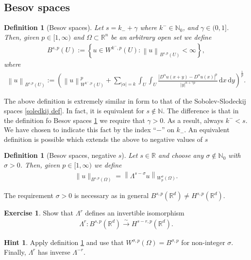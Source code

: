 \documentclass[
    a4paper,
    DIV=14,
    abstract=true,
    numbers=noenddot
]
{scrartcl}
\newtheorem{definition}[theorem]{Definition}
\theoremstyle{definition}
\newtheorem{exercise}{Exercise}
\newtheorem*{hint}{Hint}
\newcommand{\set}[1]{\left\{#1\right\}}
\renewcommand{\norm}[1]{\left\lVert #1 \right\rVert}\renewcommand{\abs}[1]{\left| #1 \right|}
\newcommand{\iso}{\xrightarrow{\sim}}
\renewcommand{\d}{\,\mathrm{d}}\newcommand{\dx}{\,\mathrm{d}x}
\newcommand{\N}{\mathbb{N}}
\newcommand{\R}{\mathbb{R}}
\begin{document}
\subsection{Besov spaces}
\begin{definition}[Besov spaces]\label{besov def}
  Let $s=k_{-}+\gamma$ where $k^{-} \in \N_0$, and $\gamma \in (0,1]$. Then, given  $p \in [1,\infty)$ and $\Omega  \subset \R^n$ be an arbitrary open set we define
  \begin{align*}
    B^{s ,p}(U):= \set{u \in W^{k^{-} ,p}(U): \norm{u}_{B^{s,p}(U)}<\infty},
  \end{align*}
  where
  \begin{align*}
    \norm{u}_{B^{s,p}(U)}:= \left(\norm{u}_{W^{k^{-},p}(U)}^p+ \sum_{\abs{\alpha}=k }\int_{U}\int_{U}\frac{\abs{D^\alpha u(x+y)-D^\alpha u(x)}^p}{\abs{y}^{n+\gamma p}}\d x \d y\right)^\frac{1}{p}.
  \end{align*}
\end{definition}
The above definition is extremely similar in form to that of the Sobolev-Slodeckij spaces \ref{soledkij def}. In fact, it is equivalent for $s \notin \N$.  The difference is that in the definition fo Besov spaces \ref{besov def} we require that $\gamma >0$. As a result, always $k^{-}<s$. We have chosen to indicate this fact by the index ``$-$'' on $k_{-}$. An equivalent definition is possible which extends the above to negative values of $s$
\begin{definition}[Besov spaces, negative $s$]\label{besov def negative}
  Let $s \in \R$ and choose any $\sigma \not\in \N_0$ with $\sigma >0$. Then, given  $p \in [1,\infty)$ we define
  \begin{align*}
    \|u\|_{B^{s,p}(\Omega)}=\left\|\Lambda^{s-\sigma} u\right\|_{W_p^\sigma(\Omega)}.
  \end{align*}
\end{definition}
The requirement $\sigma >0$ is necessary as in general $B^{s,p}(\R^d)\neq H^{s,p}(\R^d)$.
\begin{exercise}
  Show that $\Lambda ^r$ defines an invertible isomorphism
  \begin{align*}
    \Lambda ^r: B^{s,p}(\R^d)\iso H^{s-r,p}(\R^d).
  \end{align*}
\end{exercise}
\begin{hint}
  Apply definition \ref{besov def negative} and use that $W^{\sigma,p}(\Omega )= B^{\sigma,p } $ for non-integer $\sigma$. Finally,   $\Lambda^r$ has inverse $\Lambda^{-r}$.
\end{hint}
\end{document}
